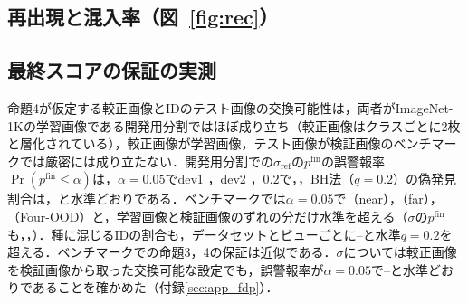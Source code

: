 \documentclass[MIRU,submit]{miru2025j}
\renewcommand\tabref[1]{\textbf{表~\ref{tab:#1}}}   %
\newcommand\pP{p^{+}}
\newcommand\pN{p^{-}}
\newcommand\pfin{p^{\mathrm{fin}}}
\newcommand\sR{\sigma_{\mathrm{ref}}}
\begin{document}
\begin{table}[t]
\caption{同じ特徴での読み出しの比較（[\%]，$\times$TINS；単体は付録\ref{sec:app_sens}の\tabref{ablx}）．静的$p$とkNNはグラフを使わない検出器，LGC-maxは同じグラフ上のクラスラベル伝播（いずれも較正順位で読む）．$\pP$は支持画像からの伝播，$\pN$は種からの伝播．到着時採点は付録\ref{sec:app_online}のモード（抽出は1通り）．\textcolor{sotacol}{$\bigstar$}は列の最良値．}
\label{tab:abl}
\centering
\vspace{0.5mm}

\end{table}

\begin{table}[t]
\caption{$u^{+}=\sqrt{\delta}\,q$の二つの因子（単体，AUROC／FPR95 [\%]，6通りの抽出の平均）．上の3行はビューごとの値のラベル付き画像4,000枚（参照画像と較正画像）の中での順位の対数和（$\sqrt{\delta}$と$q$はそれぞれ単独，$u^{+}$は積），4行目は交差適合した$\sigma$の読み出しの順位を$u^{\pm}/\sqrt{\delta}$で取ったもの（種は同じ）．}
\label{tab:dec}
\centering
\vspace{0.5mm}

\end{table}

\subsection{再出現と混入率（図~\ref{fig:rec}）}
\label{sec:rec}


\subsection{最終スコアの保証の実測}
\label{sec:fdp}
命題4が仮定する較正画像とIDのテスト画像の交換可能性は，両者がImageNet-1Kの学習画像である開発用分割ではほぼ成り立ち（較正画像はクラスごとに2枚と層化されている），較正画像が学習画像，テスト画像が検証画像のベンチマークでは厳密には成り立たない．開発用分割での$\sR$の$\pfin$の誤警報率$\Pr(\pfin\le\alpha)$は，$\alpha{=}0.05$でdev1 \NRDevOneFprFive{}，dev2 \NRDevTwoFprFive{}，$0.2$で\NRDevOneFprTwenty{}，\NRDevTwoFprTwenty{}，BH法（$q{=}0.2$）の偽発見割合は\NRDevOneBhFdp{}，\NRDevTwoBhFdp{}と水準どおりである．ベンチマークでは$\alpha{=}0.05$で\NRValNearFprFive{}（near），\NRValFarFprFive{}（far），\NRValFourFprFive{}（Four-OOD）と，学習画像と検証画像のずれの分だけ水準を超える（$\sigma$の$\pfin$も\NRValSigNearFprFive{}，\NRValSigFarFprFive{}，\NRValSigFourFprFive）．種に混じるIDの割合も，データセットとビューごとに\NRSeedBenchIdMin--\NRSeedBenchIdMax{}と水準$q{=}0.2$を超える．ベンチマークでの命題3，4の保証は近似である．$\sigma$については較正画像を検証画像から取った交換可能な設定でも，誤警報率が$\alpha{=}0.05$で\NVcalFprZeroZeroFiveMin{}--\NVcalFprZeroZeroFiveMax{}と水準どおりであることを確かめた（付録\ref{sec:app_fdp}）．
\end{document}
